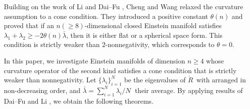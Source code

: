 \documentclass[11pt, reqno]{amsart}
\numberwithin{equation}{section}
\theoremstyle{definition}
\begin{document}
	Building on the work of Li \cite{Li5} and Dai–Fu \cite{DF}, Cheng and Wang \cite{CW} relaxed the curvature assumption to a cone condition. They introduced a positive constant $\theta(n)$ and proved that if an $n(\ge8)$-dimensional closed Einstein manifold satisfies $\lambda_1+\lambda_2\ge-2\theta(n)\bar{\lambda}$, then it is either flat or a spherical space form. This condition is strictly weaker than $2$-nonnegativity, which corresponds to $\theta=0$.
	
	In this paper, we investigate Einstein manifolds of dimension $n\ge4$ whose curvature operator of the second kind satisfies a cone condition that is strictly weaker than nonnegativity. Let $\{\lambda_{i}\}_{i=1}^{N}$ be the eigenvalues of $\mathring{R}\,$ with arranged in non-decreasing order, and $\bar{\lambda}=\sum\nolimits_{i=1}^{N}{{\lambda }_i}/{N}\;$ their average. By applying results of Dai–Fu \cite{DF} and Li \cite{Li5}, we obtain the following theorems.
	
\end{document}
